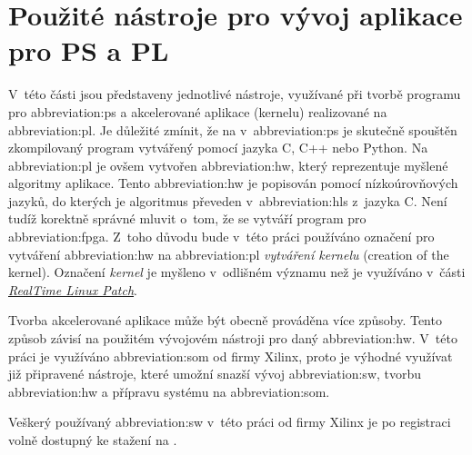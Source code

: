 \documentclass[a4paper, twoside, 11pt]{article}
\begin{document}
\section{Použité nástroje pro vývoj aplikace pro PS a PL}
V~této části jsou představeny jednotlivé nástroje, využívané při tvorbě programu pro \gls{abbreviation:ps} a akcelerované aplikace (kernelu) realizované na \gls{abbreviation:pl}. Je důležité zmínit, že na v~\gls{abbreviation:ps} je skutečně spouštěn zkompilovaný program vytvářený pomocí jazyka C, C++ nebo Python. Na \gls{abbreviation:pl} je ovšem vytvořen \gls{abbreviation:hw}, který reprezentuje myšlené algoritmy aplikace. Tento \gls{abbreviation:hw} je popisován pomocí nízkoúrovňových jazyků, do kterých je algoritmus převeden v~\gls{abbreviation:hls} z~jazyka C. Není tudíž korektně správné mluvit o~tom, že se vytváří program pro \gls{abbreviation:fpga}. Z~toho důvodu bude v~této práci používáno označení pro vytváření \gls{abbreviation:hw} na \gls{abbreviation:pl} \textit{vytváření kernelu} (creation of the kernel). Označení \textit{kernel} je myšleno v~odlišném významu než je využíváno v~části \hyperref[subsec:real-time-linux-patch]{\textit{RealTime Linux Patch}}.\par
Tvorba akcelerované aplikace může být obecně prováděna více způsoby. Tento způsob závisí na použitém vývojovém nástroji pro daný \gls{abbreviation:hw}. V~této práci je využíváno \gls{abbreviation:som} od firmy Xilinx, proto je výhodné využívat již připravené nástroje, které umožní snazší vývoj \gls{abbreviation:sw}, tvorbu \gls{abbreviation:hw} a přípravu systému na \gls{abbreviation:som}.\par
	Veškerý používaný \gls{abbreviation:sw} v~této práci od firmy Xilinx je po registraci volně dostupný ke stažení na \cite{xilinx-downloads}.
\end{document}
